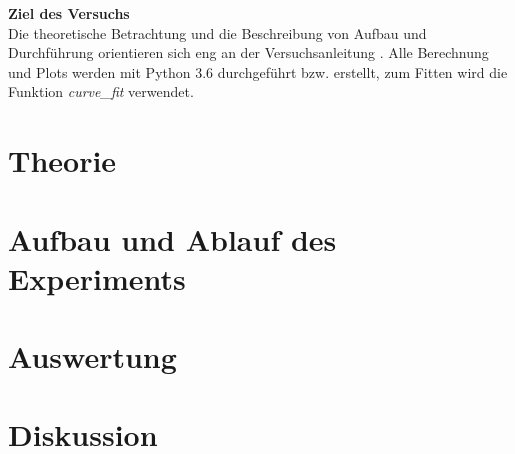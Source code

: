 \documentclass[a4,11pt]{article}
\newcommand{\V}{E2}
\begin{document}



\tableofcontents
\clearpage


\textbf{Ziel des Versuchs}  \\
Die theoretische Betrachtung und die Beschreibung von Aufbau und Durchführung orientieren sich eng an der Versuchsanleitung \cite{\V}. Alle Berechnung und Plots werden mit Python 3.6 durchgeführt bzw. erstellt, zum Fitten wird die Funktion \textit{curve\_fit} verwendet.

\section{Theorie}

\clearpage


\section{Aufbau und Ablauf des Experiments}

\clearpage


\section{Auswertung}

\clearpage


\section{Diskussion}


\clearpage
\listoftodos
\listoffigures
\listoftables
\clearpage
\nocite{\V}
\printbibliography[title = Literaturverzeichnis]
\end{document}
